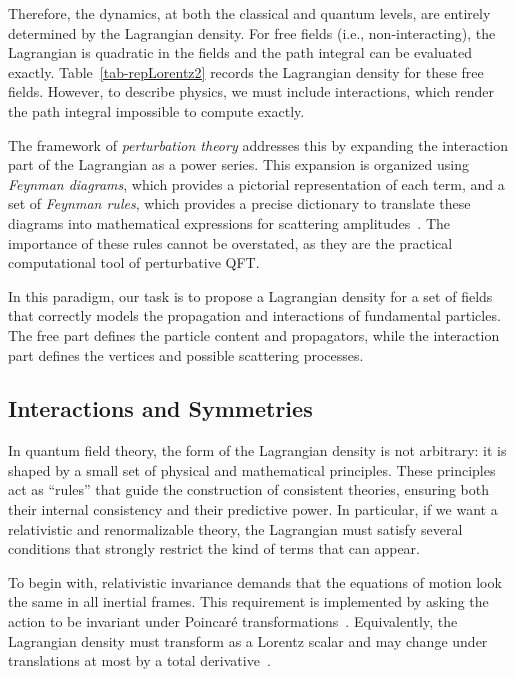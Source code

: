 Therefore, the dynamics, at both the classical and quantum levels, are entirely determined by the Lagrangian density. For free fields (i.e., non-interacting), the Lagrangian is quadratic in the fields and the path integral can be evaluated exactly. Table~\ref{tab-repLorentz2} records the Lagrangian density for these free fields. However, to describe physics, we must include interactions, which render the path integral impossible to compute exactly.

The framework of \textit{perturbation theory} addresses this by expanding the interaction part of the Lagrangian as a power series. This expansion is organized using \textit{Feynman diagrams}, which provides a pictorial representation of each term, and a set of \textit{Feynman rules}, which provides a precise dictionary to translate these diagrams into mathematical expressions for scattering amplitudes~\parencite{peskin,Weinberg}. The importance of these rules cannot be overstated, as they are the practical computational tool of perturbative QFT.


In this paradigm, our task is to propose a Lagrangian density for a set of fields that correctly models the propagation and interactions of fundamental particles. The free part defines the particle content and propagators, while the interaction part defines the vertices and possible scattering processes.

\subsection{Interactions and Symmetries}

In quantum field theory, the form of the Lagrangian density is not arbitrary: it is shaped by a small set of physical and mathematical principles. These principles act as ``rules'' that guide the construction of consistent theories, ensuring both their internal consistency and their predictive power. In particular, if we want a relativistic and renormalizable theory, the Lagrangian must satisfy several conditions that strongly restrict the kind of terms that can appear.

To begin with, relativistic invariance demands that the equations of motion look the same in all inertial frames. This requirement is implemented by asking the action to be invariant under Poincaré transformations~\parencite{pall}. Equivalently, the Lagrangian density must transform as a Lorentz scalar and may change under translations at most by a total derivative~\parencite{jose1998classical}. 

